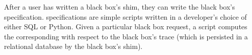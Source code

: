 After a user has written a black box's shim, they can write the black box's
\watprovenance{} specification. \fluent{} \watprovenance{} specifications are
simple scripts written in a developer's choice of either SQL or Python. Given a
particular black box request, a \watprovenance{}  script computes the
corresponding \watprovenance{} with respect to the black box's trace (which is
persisted in a relational database by the black box's shim).
%


